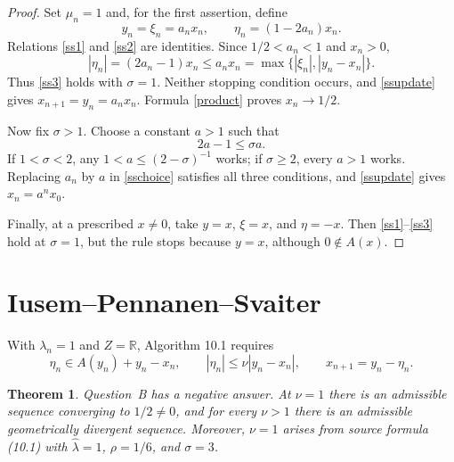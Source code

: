 \documentclass[11pt]{article}
\newtheorem{theorem}{Theorem}
\newcommand{\R}{\mathbb R}
\begin{document}
\begin{proof}
Set $\mu_n=1$ and, for the first assertion, define
\begin{equation}\label{sschoice}
 y_n=\xi_n=a_nx_n,\qquad \eta_n=(1-2a_n)x_n.
\end{equation}
Relations \eqref{ss1} and \eqref{ss2} are identities.  Since
$1/2<a_n<1$ and $x_n>0$,
\[
 |\eta_n|=(2a_n-1)x_n
 \le a_nx_n
 =\max\{|\xi_n|,|y_n-x_n|\}.
\]
Thus \eqref{ss3} holds with $\sigma=1$.  Neither stopping condition occurs,
and \eqref{ssupdate} gives $x_{n+1}=y_n=a_nx_n$.  Formula
\eqref{product} proves $x_n\to1/2$.

Now fix $\sigma>1$.  Choose a constant $a>1$ such that
\begin{equation}\label{supercritical-condition}
 2a-1\le\sigma a.
\end{equation}
If $1<\sigma<2$, any $1<a\le(2-\sigma)^{-1}$ works; if $\sigma\ge2$,
every $a>1$ works.  Replacing $a_n$ by $a$ in \eqref{sschoice} satisfies
all three conditions, and \eqref{ssupdate} gives $x_n=a^nx_0$.

Finally, at a prescribed $x\ne0$, take $y=x$, $\xi=x$, and $\eta=-x$.
Then \eqref{ss1}--\eqref{ss3} hold at $\sigma=1$, but the rule stops because
$y=x$, although $0\notin A(x)$.
\end{proof}

\section{Iusem--Pennanen--Svaiter}

With $\lambda_n=1$ and $Z=\R$, Algorithm 10.1 requires
\begin{equation}\label{ipsconditions}
 \eta_n\in A(y_n)+y_n-x_n,\qquad
 |\eta_n|\le\nu|y_n-x_n|,\qquad
 x_{n+1}=y_n-\eta_n.
\end{equation}

\begin{theorem}\label{ips-theorem}
Question~B has a negative answer.  At $\nu=1$ there is an admissible sequence
converging to $1/2\ne0$, and for every $\nu>1$ there is an admissible
geometrically divergent sequence.  Moreover, $\nu=1$ arises from source
formula (10.1) with $\widehat\lambda=1$, $\rho=1/6$, and $\sigma=3$.
\end{theorem}
\end{document}
